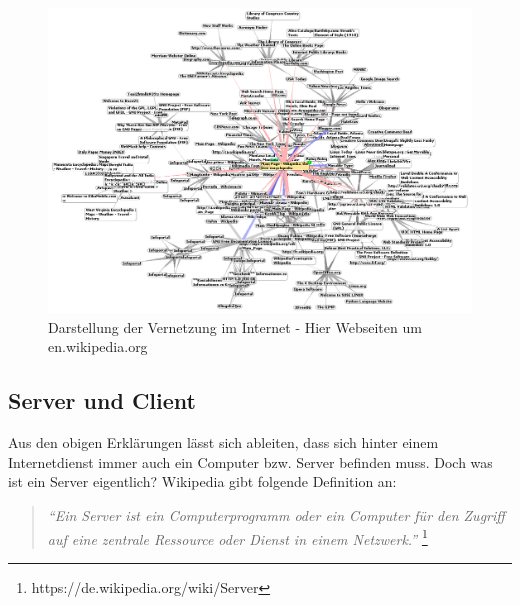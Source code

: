 \begin{figure}[H]
\centering
\includegraphics[scale=0.4]{images/wikipedia_www}
\caption{Darstellung der Vernetzung im Internet - Hier Webseiten um en.wikipedia.org}
\end{figure}

\newpage
\subsection{Server und Client}
Aus den obigen Erklärungen lässt sich ableiten, dass sich hinter einem Internetdienst immer auch ein Computer bzw. Server befinden muss.
Doch was ist ein Server eigentlich? Wikipedia gibt folgende Definition an:

\begin{quote}
\textit{``Ein Server ist ein Computerprogramm oder ein Computer für den Zugriff auf eine zentrale Ressource oder Dienst in einem Netzwerk.''}
\footnote{https://de.wikipedia.org/wiki/Server}
\end{quote}

